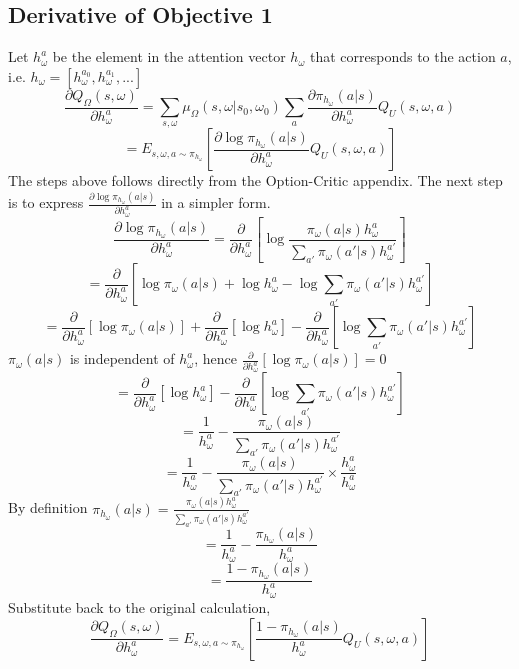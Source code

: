 \documentclass{article}
\begin{document}
	\subsection{Derivative of Objective 1}
	Let $h_\omega^a$ be the element in the attention vector $h_\omega$ that corresponds to the action $a$, i.e. $h_\omega = [h_\omega^{a_0}, h_\omega^{a_1}, ...]$
	$$\frac{\partial Q_\Omega(s,\omega)}{\partial h_\omega^a} = \sum_{s,\omega} \mu_\Omega(s,\omega|s_0, \omega_0)\sum_a \frac{\partial \pi_{h_\omega} (a|s)}{\partial h_\omega^a} Q_U(s,\omega,a)$$
	$$= E_{s,\omega,a \sim \pi_{h_\omega}}[\frac{\partial \log \pi_{h_\omega}(a|s)}{\partial h_\omega^a}Q_U(s,\omega,a)]$$
	The steps above follows directly from the Option-Critic appendix. The next step is to express $\frac{\partial \log \pi_{h_\omega} (a|s)}{\partial h_\omega^a}$ in a simpler form.
	$$\frac{\partial \log \pi_{h_\omega} (a|s)}{\partial h_\omega^a} = \frac{\partial}{\partial h_\omega^a} [\log\frac{\pi_\omega(a|s)h_\omega^a}{\sum_{a'} \pi_\omega(a'|s)h_\omega^{a'}}]$$
	$$=\frac{\partial}{\partial h_\omega^a} [\log\pi_\omega(a|s) + \log h_\omega^a - \log\sum_{a'}\pi_\omega(a'|s)h_\omega^{a'}]$$
	$$=\frac{\partial}{\partial h_\omega^a} [\log\pi_\omega(a|s)] + \frac{\partial}{\partial h_\omega^a}[\log h_\omega^a] - \frac{\partial}{\partial h_\omega^a}[\log\sum_{a'}\pi_\omega(a'|s)h_\omega^{a'}]$$
	$\pi_\omega(a|s)$ is independent of $h_\omega^a$, hence $\frac{\partial}{\partial h_\omega^a} [\log\pi_\omega(a|s)]=0$
	$$= \frac{\partial}{\partial h_\omega^a}[\log h_\omega^a] - \frac{\partial}{\partial h_\omega^a}[\log\sum_{a'}\pi_\omega(a'|s)h_\omega^{a'}]$$
	$$= \frac{1}{h_\omega^a} - \frac{\pi_\omega(a|s)}{\sum_{a'}\pi_\omega(a'|s)h_\omega^{a'}}$$
	$$= \frac{1}{h_\omega^a} - \frac{\pi_\omega(a|s)}{\sum_{a'}\pi_\omega(a'|s)h_\omega^{a'}} \times \frac{h_\omega^a}{h_\omega^a}$$
	By definition $\pi_{h_\omega}(a|s)=\frac{\pi_\omega(a|s)h_\omega^a}{\sum_{a'} \pi_\omega(a'|s)h_\omega^{a'}}$
	$$= \frac{1}{h_\omega^a} - \frac{\pi_{h_\omega}(a|s)}{h_\omega^a}$$
	$$= \frac{1-\pi_{h_\omega}(a|s)}{h_\omega^a}$$
	Substitute back to the original calculation,
	$$\frac{\partial Q_\Omega(s,\omega)}{\partial h_\omega^a} = E_{s,\omega,a \sim \pi_{h_\omega}}[\frac{1-\pi_{h_\omega}(a|s)}{h_\omega^a}Q_U(s,\omega,a)]$$
\end{document}
